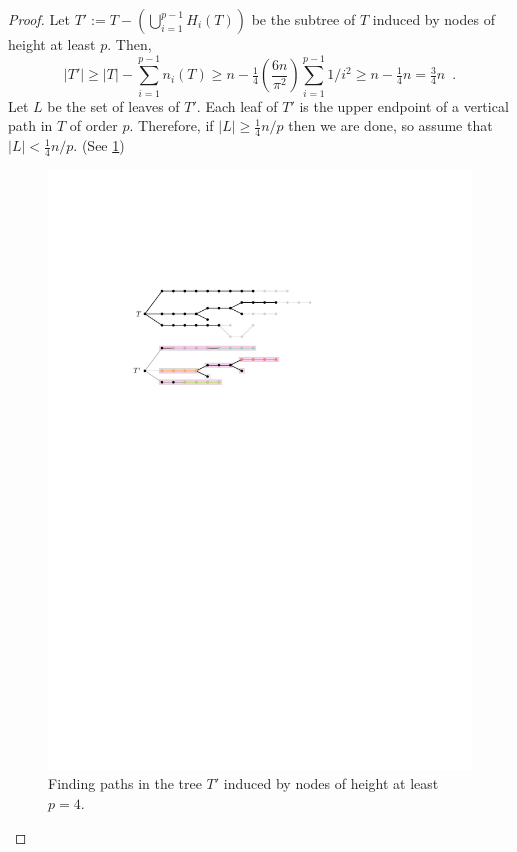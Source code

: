 \documentclass[kpfonts,lotsofwhite]{patmorin}
\renewcommand{\ge}{\geqslant}
\theoremstyle{plain}
\theoremstyle{definition}
\begin{document}
\begin{proof}
  Let $T':=T-(\bigcup_{i=1}^{p-1} H_i(T))$ be the subtree of $T$ induced by nodes of height at least $p$.  Then,
  \[
    |T'|\ge |T| - \sum_{i=1}^{p-1} n_i(T)
    \ge n - \tfrac{1}{4}\left(\frac{6n}{\pi^2}\right)\sum_{i=1}^{p-1} 1/i^2
    \ge  n - \tfrac{1}{4}n = \tfrac{3}{4}n \enspace .
  \]
  Let $L$ be the set of leaves of $T'$.  Each leaf of $T'$ is the upper endpoint of a vertical path in $T$ of order $p$.  Therefore, if $|L|\ge \tfrac{1}{4}n/p$ then we are done, so assume that $|L|<\tfrac{1}{4}n/p$.  (See \ref{disjoint_p_paths_figs})

  \begin{figure}
    \begin{center}
      \includegraphics{figs/disjoint-paths}
    \end{center}
    \caption{Finding paths in the tree $T'$ induced by nodes of height at least $p=4$.}
    \label{disjoint_p_paths_figs}
  \end{figure}


\end{proof}
\end{document}

